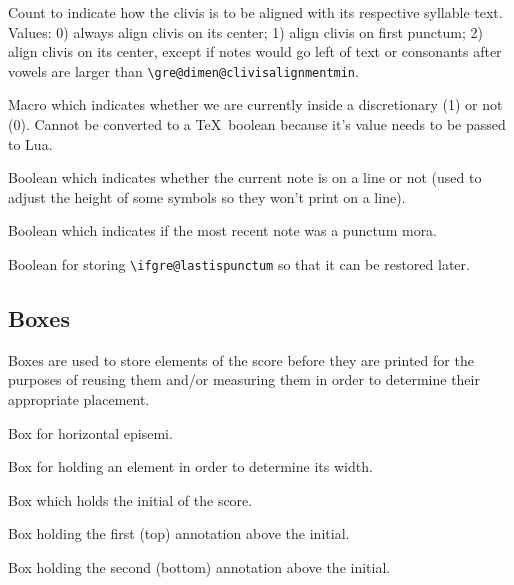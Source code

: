 Count to indicate how the clivis is to be aligned with its respective syllable text.  Values: 0) always align clivis on its center; 1) align clivis on first punctum; 2) align clivis on its center, except if notes would go left of text or consonants after vowels are larger than \verb=\gre@dimen@clivisalignmentmin=.

Macro which indicates whether we are currently inside a discretionary (1) or not (0).  Cannot be converted to a \TeX\ boolean because it's value needs to be passed to Lua.

Boolean which indicates whether the current note is on a line or not (used to adjust the height of some symbols so they won't print on a line).

Boolean which indicates if the most recent note was a punctum mora.

Boolean for storing \verb=\ifgre@lastispunctum= so that it can be restored later.



\subsection{Boxes}

Boxes are used to store elements of the score before they are printed for the purposes of reusing them and/or measuring them in order to determine their appropriate placement.

Box for horizontal episemi.

Box for holding an element in order to determine its width.

Box which holds the initial of the score.

Box holding the first (top) annotation above the initial.

Box holding the second (bottom) annotation above the initial.

